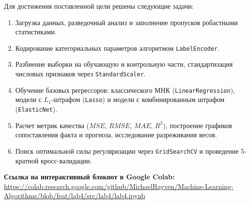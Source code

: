 Для достижения поставленной цели решены следующие задачи:
\begin{enumerate}
    \item Загрузка данных, разведочный анализ и заполнение пропусков робастными статистиками.
    \item Кодирование категориальных параметров алгоритмом \texttt{LabelEncoder}.
    \item Разбиение выборки на обучающую и контрольную части, стандартизация числовых признаков через \texttt{StandardScaler}.
    \item Обучение базовых регрессоров: классического МНК (\texttt{LinearRegression}), модели с $L_1$-штрафом (\texttt{Lasso}) и модели с комбинированным штрафом (\texttt{ElasticNet}).
    \item Расчет метрик качества ($MSE$, $RMSE$, $MAE$, $R^2$), построение графиков сопоставления факта и прогноза, исследование разреживания весов.
    \item Поиск оптимальной силы регуляризации через \texttt{GridSearchCV} и проведение 5-кратной кросс-валидации.
\end{enumerate}

\vspace{12pt}
\noindent \textbf{Ссылка на интерактивный блокнот в Google Colab:} \\
{\footnotesize\url{https://colab.research.google.com/github/MichaelRayven/Machine-Learning-Algorithms/blob/feat/lab4/src/lab4/lab4.ipynb}}
